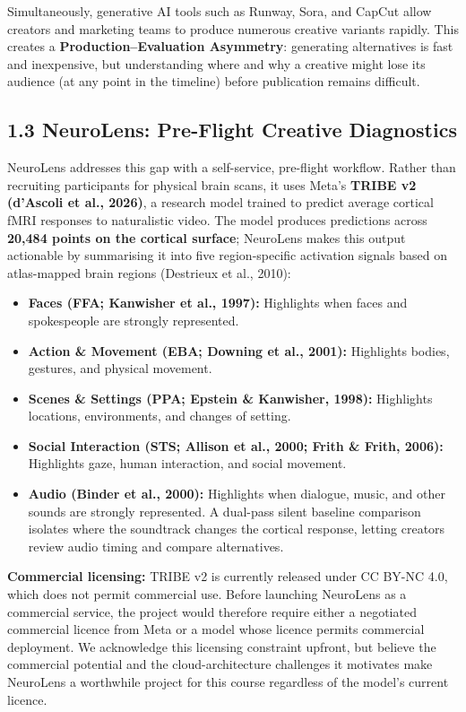 \documentclass[10pt,a4paper]{article}
\begin{document}
Simultaneously, generative AI tools such as Runway, Sora, and CapCut allow creators and marketing teams to produce numerous creative variants rapidly. This creates a \textbf{Production--Evaluation Asymmetry}: generating alternatives is fast and inexpensive, but understanding where and why a creative might lose its audience (at any point in the timeline) before publication remains difficult.

\subsection*{\textsf{1.3 NeuroLens: Pre-Flight Creative Diagnostics}}
NeuroLens addresses this gap with a self-service, pre-flight workflow. Rather than recruiting participants for physical brain scans, it uses Meta's \textbf{TRIBE v2 (d'Ascoli et al., 2026)}, a research model trained to predict average cortical fMRI responses to naturalistic video. The model produces predictions across \textbf{20,484 points on the cortical surface}; NeuroLens makes this output actionable by summarising it into five region-specific activation signals based on atlas-mapped brain regions (Destrieux et al., 2010):
\begin{itemize}
    \item \textbf{Faces (FFA; Kanwisher et al., 1997):} Highlights when faces and spokespeople are strongly represented.
    \item \textbf{Action \& Movement (EBA; Downing et al., 2001):} Highlights bodies, gestures, and physical movement.
    \item \textbf{Scenes \& Settings (PPA; Epstein \& Kanwisher, 1998):} Highlights locations, environments, and changes of setting.
    \item \textbf{Social Interaction (STS; Allison et al., 2000; Frith \& Frith, 2006):} Highlights gaze, human interaction, and social movement.
    \item \textbf{Audio (Binder et al., 2000):} Highlights when dialogue, music, and other sounds are strongly represented. A dual-pass silent baseline comparison isolates where the soundtrack changes the cortical response, letting creators review audio timing and compare alternatives.
\end{itemize}

\textbf{Commercial licensing:} TRIBE v2 is currently released under CC BY-NC 4.0, which does not permit commercial use. Before launching NeuroLens as a commercial service, the project would therefore require either a negotiated commercial licence from Meta or a model whose licence permits commercial deployment. We acknowledge this licensing constraint upfront, but believe the commercial potential and the cloud-architecture challenges it motivates make NeuroLens a worthwhile project for this course regardless of the model's current licence.
\end{document}
